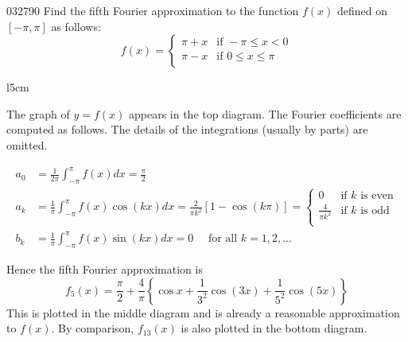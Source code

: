 \newpage
\begin{example}{}{032790}
Find the fifth Fourier approximation to the function $f(x)$ defined on $[-\pi, \pi]$ as follows:
\begin{equation*}
f(x) = \left\{
\begin{array}{ll}
\pi + x & \mbox{if } -\pi \leq x < 0 \\
\pi - x & \mbox{if } 0 \leq x \leq \pi \\
\end{array}
\right.
\end{equation*}

\begin{wrapfigure}{l}{5cm} 
\vspace*{-6em}
\centering

\end{wrapfigure}

\setlength{\rightskip}{0pt plus 200pt} 
\begin{solution} The graph of $y = f(x)$ appears in the top diagram. The Fourier coefficients are computed as follows. The details of the integrations (usually by parts) are omitted.

\begin{align*}
a_0 &= \frac{1}{2\pi} \int_{-\pi}^{\pi} f(x)dx = \frac{\pi}{2} \\
a_k &= \frac{1}{\pi} \int_{-\pi}^{\pi} f(x)\cos(kx)dx = \frac{2}{\pi k^2}[1 - \cos(k\pi)] = 
\left\{
\begin{array}{ll}
0 			& \mbox{if } k \mbox{ is even} \\
\frac{4}{\pi k^2} 	& \mbox{if } k \mbox{ is odd} \\
\end{array}
\right. \\
b_k &= \frac{1}{\pi} \int_{-\pi}^{\pi} f(x)\sin(kx)dx = 0 \quad \mbox{ for all } k = 1, 2, \dots
\end{align*}

Hence the fifth Fourier approximation is
\begin{equation*}
f_5(x) = \frac{\pi}{2} + \frac{4}{\pi}\left\{\cos x + \frac{1}{3^2} \cos(3x) + \frac{1}{5^2} \cos(5x) \right\}
\end{equation*}
This is plotted in the middle diagram and is already a reasonable approximation to $f(x)$. By comparison, $f_{13}(x)$ is also plotted in the bottom diagram.
\end{solution}
\end{example}


